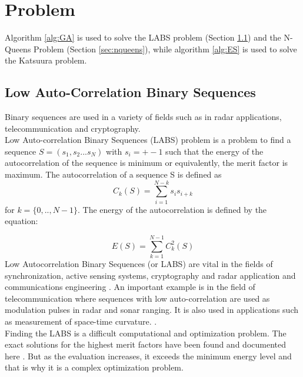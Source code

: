\documentclass{article}
\begin{document}
\section{Problem}
Algorithm \ref{alg:GA} is used to solve the LABS problem (Section \ref{sec:labs}) and the N-Queens Problem (Section \ref{sec:nqueens}), while algorithm \ref{alg:ES} is used to solve the Katsuura problem. 
\subsection{Low Auto-Correlation Binary Sequences}\label{sec:labs}
Binary sequences are used in a variety of fields such as in radar applications, telecommunication and cryptography. \\
Low Auto-correlation Binary Sequences (LABS) problem is a problem to find a sequence $S = (s_1, s_2 ... s_N)$ with $ s_i = +-1$ such that the energy of the autocorrelation of the sequence is minimum or equivalently, the merit factor is maximum.  The autocorrelation of a sequence S is defined as 
\begin{equation*}
    C_k(S) = \sum_{i=1}^{N-k}s_is_{i+k}
\end{equation*}
for $k  = \{0,..,N-1\}$. The energy of the autocorrelation is defined by the equation: 

\begin{equation*}
    E(S) = \sum_{k=1}^{N-1}C_k^2(S)
\end{equation*}
Low Autocorrelation Binary Sequences (or LABS) are vital in the fields of  synchronization, active sensing systems, cryptography and radar application and communications engineering \cite{9422706}. An important example is in the field of telecommunication where sequences with low auto-correlation are used as modulation pulses in radar and sonar ranging. It is also used in applications such as measurement of space-time curvature. \cite{Packebusch_2016}.\\
Finding the LABS is a difficult computational and optimization problem. The exact solutions for the highest merit factors have been found and documented here \cite{Ukil_2010}. But as the evaluation increases, it exceeds the minimum energy level and that is why it is a complex optimization problem.\\
\end{document}
